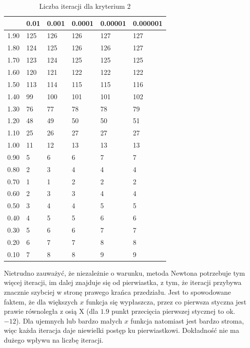 \documentclass{article}
\begin{document}
\begin{table}[H]
\centering
\begin{tabular}{|l|l|l|l|l|l|}
\hline
& 0.01 & 0.001 & 0.0001 & 0.00001 & 0.000001 \\ \hline
1.90 & 125 & 126 & 126 & 127 & 127 \\ \hline
1.80 & 124 & 125 & 126 & 126 & 127 \\ \hline
1.70 & 123 & 124 & 125 & 125 & 125 \\ \hline
1.60 & 120 & 121 & 122 & 122 & 122 \\ \hline
1.50 & 113 & 114 & 115 & 115 & 116 \\ \hline
1.40 & 99 & 100 & 101 & 101 & 102 \\ \hline
1.30 & 76 & 77 & 78 & 78 & 79 \\ \hline
1.20 & 48 & 49 & 50 & 50 & 51 \\ \hline
1.10 & 25 & 26 & 27 & 27 & 27 \\ \hline
1.00 & 11 & 12 & 13 & 13 & 13 \\ \hline
0.90 & 5 & 6 & 6 & 7 & 7 \\ \hline
0.80 & 2 & 3 & 4 & 4 & 4 \\ \hline
0.70 & 1 & 1 & 2 & 2 & 2 \\ \hline
0.60 & 2 & 3 & 3 & 4 & 4 \\ \hline
0.50 & 3 & 4 & 4 & 5 & 5 \\ \hline
0.40 & 4 & 5 & 5 & 6 & 6 \\ \hline
0.30 & 5 & 6 & 6 & 7 & 7 \\ \hline
0.20 & 6 & 7 & 7 & 8 & 8 \\ \hline
0.10 & 7 & 8 & 8 & 9 & 9 \\ \hline
\end{tabular}
\caption{Liczba iteracji dla kryterium 2}
\end{table}

Nietrudno zauważyć, że niezależnie o warunku, metoda Newtona potrzebuje tym więcej iteracji, im dalej znajduje się od
pierwiastka, z tym, że iteracji przybywa znacznie szybciej w stronę prawego krańca przedziału. Jest to spowodowane faktem, że dla większych $x$ funkcja się wypłaszcza, przez co pierwsza styczna
jest prawie równoległa z osią X (dla $1.9$ punkt przecięcia pierwszej stycznej to ok. $-12$). Dla ujemnych lub bardzo małych
$x$ funkcja natomiast jest bardzo stroma, więc każda iteracja daje niewielki postęp ku pierwiastkowi. Dokładność
nie ma dużego wpływu na liczbę iteracji.
\end{document}
